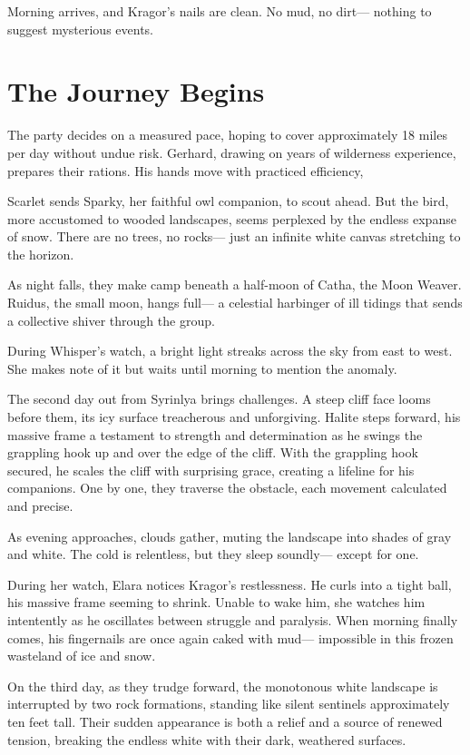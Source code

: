 \documentclass[
  letterpaper,12pt,twoside,twocolumn,openany,
  nodeprecatedcode,bg=full]{dndbook}
\begin{document}
Morning arrives, and Kragor's nails are clean. No mud, no dirt---
nothing to suggest mysterious events.

\section{The Journey Begins}\label{the-journey-begins}

The party decides on a measured pace, hoping to cover approximately 18
miles per day without undue risk. Gerhard, drawing on years of
wilderness experience, prepares their rations. His hands move with
practiced efficiency,

Scarlet sends Sparky, her faithful owl companion, to scout ahead. But
the bird, more accustomed to wooded landscapes, seems perplexed by the
endless expanse of snow. There are no trees, no rocks--- just an
infinite white canvas stretching to the horizon.

As night falls, they make camp beneath a half-moon of Catha, the Moon
Weaver. Ruidus, the small moon, hangs full--- a celestial harbinger of
ill tidings that sends a collective shiver through the group.

During Whisper's watch, a bright light streaks across the sky from east
to west. She makes note of it but waits until morning to mention the
anomaly.

The second day out from Syrinlya brings challenges. A steep cliff face
looms before them, its icy surface treacherous and unforgiving. Halite
steps forward, his massive frame a testament to strength and
determination as he swings the grappling hook up and over the edge of
the cliff. With the grappling hook secured, he scales the cliff with
surprising grace, creating a lifeline for his companions. One by one,
they traverse the obstacle, each movement calculated and precise.

As evening approaches, clouds gather, muting the landscape into shades
of gray and white. The cold is relentless, but they sleep soundly---
except for one.

During her watch, Elara notices Kragor's restlessness. He curls into a
tight ball, his massive frame seeming to shrink. Unable to wake him, she
watches him intentently as he oscillates between struggle and paralysis.
When morning finally comes, his fingernails are once again caked with
mud--- impossible in this frozen wasteland of ice and snow.

On the third day, as they trudge forward, the monotonous white landscape
is interrupted by two rock formations, standing like silent sentinels
approximately ten feet tall. Their sudden appearance is both a relief
and a source of renewed tension, breaking the endless white with their
dark, weathered surfaces.
\end{document}
